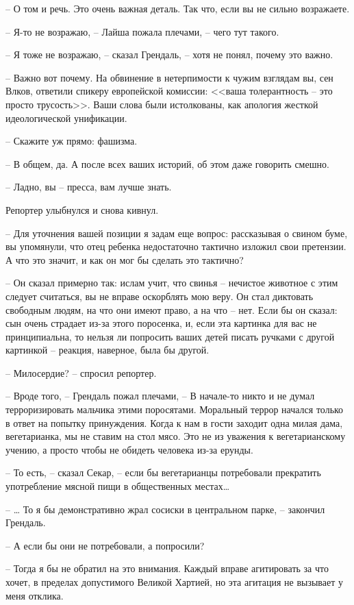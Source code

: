 -- О том и речь. Это очень важная деталь. Так что, если вы не сильно возражаете.

-- Я-то не возражаю, -- Лайша пожала плечами, -- чего тут такого.

-- Я тоже не возражаю, -- сказал Грендаль, -- хотя не понял, почему это важно.

-- Важно вот почему. На обвинение в нетерпимости к чужим взглядам вы, сен Влков, ответили спикеру европейской комиссии: <<ваша толерантность -- это просто трусость>>. Ваши слова были истолкованы, как апология жесткой идеологической унификации.

-- Скажите уж прямо: фашизма.

-- В общем, да. А после всех ваших историй, об этом даже говорить смешно.

-- Ладно, вы -- пресса, вам лучше знать.

Репортер улыбнулся и снова кивнул.

-- Для уточнения вашей позиции я задам еще вопрос: рассказывая о свином буме, вы упомянули, что отец ребенка недостаточно тактично изложил свои претензии. А что это значит, и как он мог бы сделать это тактично?

-- Он сказал примерно так: ислам учит, что свинья -- нечистое животное с этим следует считаться, вы не вправе оскорблять мою веру. Он стал диктовать свободным людям, на что они имеют право, а на что -- нет. Если бы он сказал: сын очень страдает из-за этого поросенка, и, если эта картинка для вас не принципиальна, то нельзя ли попросить ваших детей писать ручками с другой картинкой -- реакция, наверное, была бы другой.

-- Милосердие? -- спросил репортер.

-- Вроде того, -- Грендаль пожал плечами, -- В начале-то никто и не думал терроризировать мальчика этими поросятами. Моральный террор начался только в ответ на попытку принуждения. Когда к нам в гости заходит одна милая дама, вегетарианка, мы не ставим на стол мясо. Это не из уважения к вегетарианскому учению, а просто чтобы не обидеть человека из-за ерунды.

-- То есть, -- сказал Секар, -- если бы вегетарианцы потребовали прекратить употребление мясной пищи в общественных местах\ldots{}

-- \ldots{} То я бы демонстративно жрал сосиски в центральном парке, -- закончил Грендаль.

-- А если бы они не потребовали, а попросили?

-- Тогда я бы не обратил на это внимания. Каждый вправе агитировать за что хочет, в пределах допустимого Великой Хартией, но эта агитация не вызывает у меня отклика.

